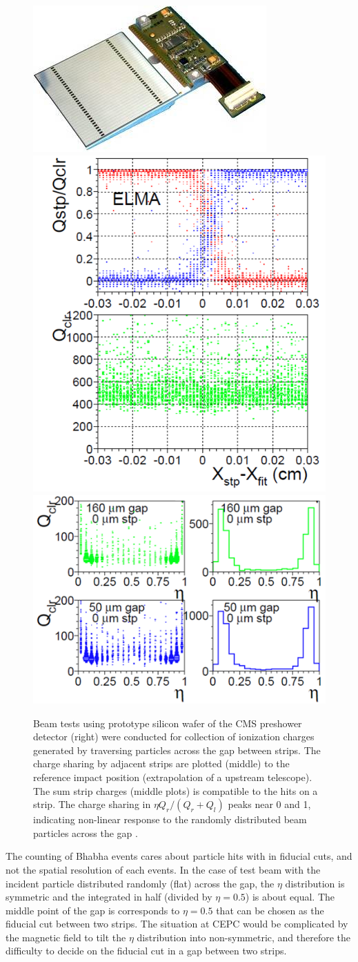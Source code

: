 \begin{figure}[b!] 
	\centering
	\includegraphics[width=.22\linewidth]{Figures/MDI/CMS_preshower.jpg} 
	\hspace{.2cm}
	\includegraphics[width=.28\linewidth]{Figures/MDI/CMS_strip_Q.png}  
	\hspace{.2cm}
	\includegraphics[width=.40\linewidth]{Figures/MDI/CMS_strip_gap.png} 
	\vspace{.2cm}
	\caption{  
		Beam tests using prototype silicon wafer of the CMS preshower detector (right) were conducted for collection of ionization charges generated by traversing particles across the gap between strips. The charge sharing by adjacent strips are plotted (middle) to the reference impact position (extrapolation of a upstream telescope). The sum strip charges (middle plots) is compatible to the hits on a strip. The charge sharing in $\eta Q_r/(Q_r+Q_l)$ peaks near 0 and 1,
		indicating non-linear response to the randomly distributed beam particles across the gap \cite{CMS_2000-042}.
		\label{fig:strip_gap} }
\end{figure}

The counting of Bhabha events cares about particle hits with in fiducial cuts, and not the spatial resolution of each events. In the case of test beam with the incident particle distributed randomly (flat) across the gap, the $\eta$ distribution is symmetric and the integrated in half (divided by $\eta=0.5$) is about equal. The middle point of the gap is corresponds to $\eta=0.5$ that can be chosen as the fiducial cut between two strips. The situation at CEPC would be complicated by the magnetic field to tilt the $\eta$ distribution into non-symmetric, and therefore the difficulty to decide on the fiducial cut in a gap between two strips.

